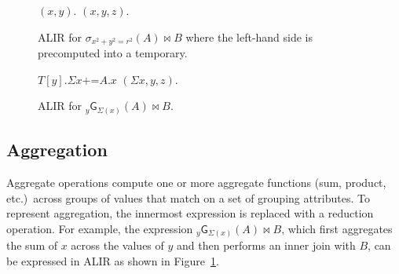 \documentclass[acmsmall,screen,nonacm]{acmart}\settopmatter{printfolios=true,printccs=false,printacmref=false}
\newcommand*{\agg}{\mathsf{G}}
\newcommand*{\plusequals}{\mathrel{\mathord{+}\mathord{=}}}
\DeclareMathOperator*{\ijoin}{\Join}
\begin{document}
\begin{figure}[b]%
    \begin{minipage}[t]{0.45\textwidth}
        \begin{algorithmic}\footnotesize
                        \State $(x, y).$
                    \EndALIRFor
                \EndALIRFor
            \ALIRIn
                            \State $(x, y, z).$
                        \EndALIRFor
                    \EndALIRFor
                \EndALIRFor
            \EndALIRLet
        \end{algorithmic}
        \vspace{-1em}
        \caption{ALIR for $\sigma_{x^2 + y^2 = r^2}(A) \ijoin B$ where the left-hand side is precomputed into a temporary.}
        \label{fig:alir-precompute}
        \vspace{-0.5em}
    \end{minipage}\hfill\begin{minipage}[t]{0.45\textwidth}
        \begin{algorithmic}\footnotesize
                        \State $T[y].\Sigma x \plusequals A.x$
                    \EndALIRFor
                \EndALIRFor
            \ALIRIn
                            \State $(\Sigma x, y, z).$
                        \EndALIRFor
                    \EndALIRFor
                \EndALIRFor
            \EndALIRLet
        \end{algorithmic}
        \vspace{-1em}
        \caption{ALIR for $_{y}\agg_{\Sigma(x)}(A) \ijoin B$.}
        \label{fig:alir-aggregation}
        \vspace{-0.5em}
    \end{minipage}
\end{figure}

\subsection{Aggregation}
\label{subsec:aggregation}
Aggregate operations compute one or more aggregate functions (sum, product, etc.)\ across groups of values
that match on a set of grouping attributes.
To represent aggregation, the innermost expression is replaced with
a reduction operation. For example, the expression
$_{y}\agg_{\Sigma(x)}(A) \ijoin B$, which first aggregates
the sum of $x$ across the values of $y$ and then performs an inner join with $B$,
can be expressed in ALIR as shown in Figure~\ref{fig:alir-aggregation}.
\end{document}

